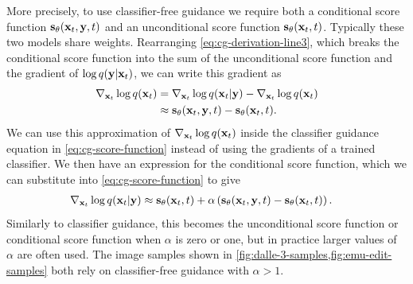 More precisely, to use classifier-free guidance we require both a conditional score function ${\mathbf{s}}_\theta({\mathbf{x}}_t, {\mathbf{y}}, t)$ and an unconditional score function ${\mathbf{s}}_\theta({\mathbf{x}}_t, t)$. Typically these two models share weights. Rearranging \cref{eq:cg-derivation-line3}, which breaks the conditional score function into the sum of the unconditional score function and the gradient of $\log q({\mathbf{y}}|{\mathbf{x}}_t)$, we can write this gradient as
\begin{align}
    \nabla_{{\mathbf{x}}_t} \log q({\mathbf{x}}_t) &= \nabla_{{\mathbf{x}}_t} \log q({\mathbf{x}}_t|{\mathbf{y}}) - \nabla_{{\mathbf{x}}_t} \log q({\mathbf{x}}_t) \\
    &\approx {\mathbf{s}}_\theta({\mathbf{x}}_t, {\mathbf{y}}, t) - {\mathbf{s}}_\theta({\mathbf{x}}_t, t).
\end{align}
We can use this approximation of $\nabla_{{\mathbf{x}}_t} \log q({\mathbf{x}}_t)$ inside the classifier guidance equation in \cref{eq:cg-score-function} instead of using the gradients of a trained classifier. We then have an expression for the conditional score function, which we can substitute into \cref{eq:cg-score-function} to give
\begin{align}
    \nabla_{{\mathbf{x}}_t} \log q({\mathbf{x}}_t|{\mathbf{y}}) &\approx {\mathbf{s}}_\theta({\mathbf{x}}_t, t) + \alpha \left( {\mathbf{s}}_\theta({\mathbf{x}}_t, {\mathbf{y}}, t) - {\mathbf{s}}_\theta({\mathbf{x}}_t, t) \right). \label{eq:cfg-score-function}
\end{align}
Similarly to classifier guidance, this becomes the unconditional score function or conditional score function when $\alpha$ is zero or one, but in practice larger values of $\alpha$ are often used. The image samples shown in \cref{fig:dalle-3-samples,fig:emu-edit-samples} both rely on classifier-free guidance with $\alpha > 1$. 


